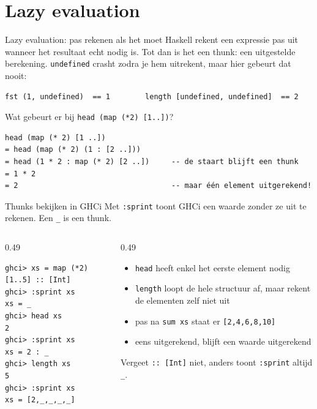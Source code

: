 \documentclass[aspectratio=169,11pt]{beamer}
\newcommand{\hs}{\lstinline[style=hsinline]}
\begin{document}
\section{Lazy evaluation}

\begin{frame}[fragile]{Lazy evaluation: pas rekenen als het moet}
  Haskell rekent een expressie pas uit wanneer het resultaat \alert{echt nodig} is. Tot dan is het een \alert{thunk}: een uitgestelde berekening. \hs|undefined| crasht zodra je hem uitrekent, maar hier gebeurt dat nooit:
  \begin{lstlisting}[aboveskip=2pt]
fst (1, undefined)  == 1        length [undefined, undefined]  == 2
\end{lstlisting}
\pause
Wat gebeurt er bij \hs|head (map (*2) [1..])|?
\begin{lstlisting}[aboveskip=2pt]
  head (map (* 2) [1 ..])
= head (map (* 2) (1 : [2 ..]))
= head (1 * 2 : map (* 2) [2 ..])     -- de staart blijft een thunk
= 1 * 2
= 2                                   -- maar één element uitgerekend!
\end{lstlisting}
\end{frame}

\begin{frame}[fragile]{Thunks bekijken in GHCi}
  Met \hs|:sprint| toont GHCi een waarde \alert{zonder} ze uit te rekenen. Een \hs|_| is een thunk.
  \begin{columns}[T,onlytextwidth]
    \begin{column}{0.49\textwidth}
\begin{lstlisting}[aboveskip=2pt]
ghci> xs = map (*2) [1..5] :: [Int]
ghci> :sprint xs
xs = _
ghci> head xs
2
ghci> :sprint xs
xs = 2 : _
ghci> length xs
5
ghci> :sprint xs
xs = [2,_,_,_,_]
\end{lstlisting}
    \end{column}
    \begin{column}{0.49\textwidth}
      \small
      \begin{itemize}
        \item \hs|head| heeft enkel het eerste element nodig
        \item \hs|length| loopt de hele \alert{structuur} af, maar rekent de elementen zelf niet uit
        \item pas na \hs|sum xs| staat er \hs|[2,4,6,8,10]|
        \item eens uitgerekend, \alert{blijft} een waarde uitgerekend
      \end{itemize}
      \medskip
      Vergeet \hs|:: [Int]| niet, anders toont \hs|:sprint| altijd \hs|_|.
    \end{column}
  \end{columns}
\end{frame}
\end{document}
